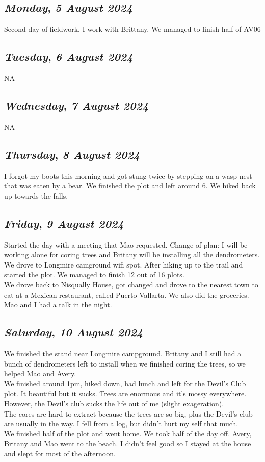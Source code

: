 \def\day{\textit{5 August 2024}}
\def\weekday{\textit{Monday}}
\subsection*{\weekday, \day}
Second day of fieldwork. I work with Brittany. We managed to finish half of AV06

\def\day{\textit{6 August 2024}}
\def\weekday{\textit{Tuesday}}
\subsection*{\weekday, \day}
NA
\def\day{\textit{7 August 2024}}
\def\weekday{\textit{Wednesday}}
\subsection*{\weekday, \day}
NA
\def\day{\textit{8 August 2024}}
\def\weekday{\textit{Thursday}}
\subsection*{\weekday, \day}
I forgot my boots this morning and got stung twice by stepping on a wasp nest that was eaten by a bear. We finished the plot and left around 6. We hiked back up towards the falls. 

\def\day{\textit{9 August 2024}}
\def\weekday{\textit{Friday}}
\subsection*{\weekday, \day}
Started the day with a meeting that Mao requested. Change of plan: I will be working alone for coring trees and Britany will be installing all the dendrometers. We drove to Longmire camground wifi spot. After hiking up to the trail and started the plot. We managed to finish 12 out of 16 plots.\\
We drove back to Nisqually House, got changed and drove to the nearest town to eat at a Mexican restaurant, called Puerto Vallarta. We also did the groceries. Mao and I had a talk in the night. 

\def\day{\textit{10 August 2024}}
\def\weekday{\textit{Saturday}}
\subsection*{\weekday, \day}
We finished the stand near Longmire campground. Britany and I still had a bunch of dendrometers left to install when we finished coring the trees, so we helped Mao and Avery.\\ We finished around 1pm, hiked down, had lunch and left for the Devil's Club plot. It beautiful but it sucks. Trees are enormous and it's mossy everywhere. However, the Devil's club sucks the life out of me (slight exageration). \\
The cores are hard to extract because the trees are so big, plus the Devil's club are usually in the way. I fell from a log, but didn't hurt my self that much. \\
We finished half of the plot and went home. We took half of the day off. Avery, Britany and Mao went to the beach. I didn't feel good so I stayed at the house and slept for most of the afternoon. 
 
